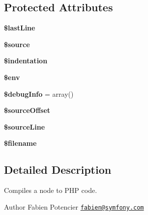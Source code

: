 \subsection*{Protected Attributes}
\begin{DoxyCompactItemize}
\item 
{\bfseries \$last\+Line}\hypertarget{classTwig__Compiler_a1b24638c6b7c6c58263187551412fbad}{}\label{classTwig__Compiler_a1b24638c6b7c6c58263187551412fbad}

\item 
{\bfseries \$source}\hypertarget{classTwig__Compiler_a6ebd9eb201843a61349f663cc7276852}{}\label{classTwig__Compiler_a6ebd9eb201843a61349f663cc7276852}

\item 
{\bfseries \$indentation}\hypertarget{classTwig__Compiler_a8496eff527794f3d1e656eb0ef8e0e95}{}\label{classTwig__Compiler_a8496eff527794f3d1e656eb0ef8e0e95}

\item 
{\bfseries \$env}\hypertarget{classTwig__Compiler_a231c5f6cf88293a4156a3e9d8b35faa6}{}\label{classTwig__Compiler_a231c5f6cf88293a4156a3e9d8b35faa6}

\item 
{\bfseries \$debug\+Info} = array()\hypertarget{classTwig__Compiler_a4fce7cefed26e0ef1e5198f6c8b34b40}{}\label{classTwig__Compiler_a4fce7cefed26e0ef1e5198f6c8b34b40}

\item 
{\bfseries \$source\+Offset}\hypertarget{classTwig__Compiler_a78874943422cbcadfa6d03d31fc8dde7}{}\label{classTwig__Compiler_a78874943422cbcadfa6d03d31fc8dde7}

\item 
{\bfseries \$source\+Line}\hypertarget{classTwig__Compiler_a6b7d23a66546f894a6c724c6053bb836}{}\label{classTwig__Compiler_a6b7d23a66546f894a6c724c6053bb836}

\item 
{\bfseries \$filename}\hypertarget{classTwig__Compiler_adaf0f0ab787e3d5a6a7cda21ab465a54}{}\label{classTwig__Compiler_adaf0f0ab787e3d5a6a7cda21ab465a54}

\end{DoxyCompactItemize}


\subsection{Detailed Description}
Compiles a node to P\+HP code.

\begin{DoxyAuthor}{Author}
Fabien Potencier \href{mailto:fabien@symfony.com}{\tt fabien@symfony.\+com} 
\end{DoxyAuthor}


